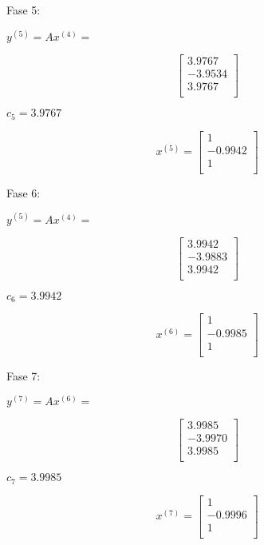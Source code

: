 Fase 5: 

\begin{center} 
$y^{(5)} = Ax^{(4)} =$
\end{center}
\[ 
    \left[ {\begin{array}{c}
   3.9767 \\
   -3.9534 \\
   3.9767 \\
  \end{array} } \right]
\]
\begin{center} 
$c_5 = 3.9767$ 


\[
x^{(5)} = 
  \left[ {\begin{array}{c}
   1  \\
   -0.9942 \\
   1 \\
  \end{array} } \right]
\]

\end{center}


Fase 6: 

\begin{center} 
$y^{(5)} = Ax^{(4)} =$
\end{center}
\[ 
    \left[ {\begin{array}{c}
   3.9942 \\
   -3.9883 \\
   3.9942 \\
  \end{array} } \right]
\]
\begin{center} 
$c_6 = 3.9942$ 


\[
x^{(6)} = 
  \left[ {\begin{array}{c}
   1  \\
   -0.9985 \\
   1 \\
  \end{array} } \right]
\]

\end{center}


Fase 7: 

\begin{center} 
$y^{(7)} = Ax^{(6)} =$
\end{center}
\[ 
    \left[ {\begin{array}{c}
   3.9985 \\
   -3.9970 \\
   3.9985 \\
  \end{array} } \right]
\]
\begin{center} 
$c_7 = 3.9985$ 


\[
x^{(7)} = 
  \left[ {\begin{array}{c}
   1  \\
   -0.9996 \\
   1 \\
  \end{array} } \right]
\]

\end{center}


